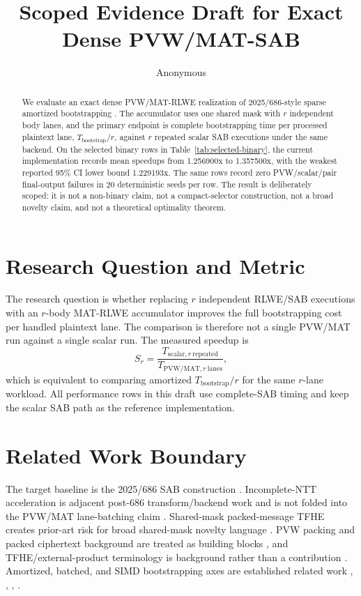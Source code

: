 \documentclass{article}
\title{Scoped Evidence Draft for Exact Dense PVW/MAT-SAB}
\author{Anonymous}
\date{}
\begin{document}
\maketitle

\begin{abstract}
We evaluate an exact dense PVW/MAT-RLWE realization of 2025/686-style sparse
amortized bootstrapping \cite{DBLP:conf/ccs/GuimaraesP25}. The accumulator uses one
shared mask with $r$ independent body lanes, and the primary endpoint is
complete bootstrapping time per processed plaintext lane, $T_{\mathrm{bootstrap}}/r$,
against $r$ repeated scalar SAB executions under the same backend. On the
selected binary rows in Table~\ref{tab:selected-binary}, the current
implementation records mean speedups from 1.256900x to 1.357500x,
with the weakest reported 95\% CI lower bound 1.229193x. The same
rows record zero PVW/scalar/pair final-output failures in 20 deterministic
seeds per row. The result is deliberately scoped: it is not a non-binary claim,
not a compact-selector construction, not a broad novelty claim, and not a
theoretical optimality theorem.
\end{abstract}

\section{Research Question and Metric}
The research question is whether replacing $r$ independent RLWE/SAB executions
with an $r$-body MAT-RLWE accumulator improves the full bootstrapping cost per
handled plaintext lane. The comparison is therefore not a single PVW/MAT run
against a single scalar run. The measured speedup is
\[
S_r = \frac{T_{\mathrm{scalar},r\ \mathrm{repeated}}}
           {T_{\mathrm{PVW/MAT},r\ \mathrm{lanes}}},
\]
which is equivalent to comparing amortized $T_{\mathrm{bootstrap}}/r$ for the
same $r$-lane workload. All performance rows in this draft use complete-SAB
timing and keep the scalar SAB path as the reference implementation.

\section{Related Work Boundary}
The target baseline is the 2025/686 SAB construction \cite{DBLP:conf/ccs/GuimaraesP25}.
Incomplete-NTT acceleration is adjacent post-686 transform/backend work and is
not folded into the PVW/MAT lane-batching claim \cite{DBLP:journals/tches/PaivaMHSY25}.
Shared-mask packed-message TFHE creates prior-art risk for broad shared-mask
novelty language \cite{DBLP:journals/tches/BergeratBCOPT25}. PVW packing and packed
ciphertext background are treated as building blocks \cite{DBLP:conf/pkc/BrakerskiGH13},
and TFHE/external-product terminology is background rather than a contribution
\cite{DBLP:journals/joc/ChillottiGGI20}. Amortized, batched, and SIMD bootstrapping axes
are established related work \cite{DBLP:conf/icalp/MicciancoS18}, \cite{DBLP:conf/asiacrypt/GuimaraesPL23},
\cite{DBLP:conf/pkc/MicheliKMS24}, \cite{DBLP:conf/asiacrypt/LiuW23}.
\end{document}

